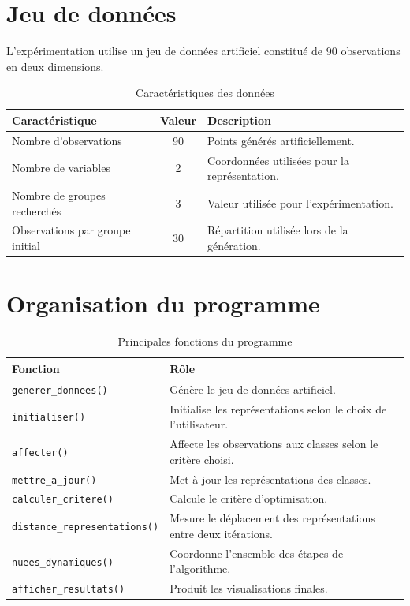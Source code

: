 \documentclass[12pt,a4paper]{report}
\begin{document}
\section{Jeu de données}

L'expérimentation utilise un jeu de données artificiel constitué de
90 observations en deux dimensions.

\begin{table}[H]
\centering
\caption{Caractéristiques des données}
\label{tab:donnees}
\begin{tabular}{|l|c|p{7cm}|}
\hline
\textbf{Caractéristique} & \textbf{Valeur} & \textbf{Description} \\
\hline
Nombre d'observations & 90 & Points générés artificiellement. \\
\hline
Nombre de variables & 2 & Coordonnées utilisées pour la représentation. \\
\hline
Nombre de groupes recherchés & 3 & Valeur utilisée pour l'expérimentation. \\
\hline
Observations par groupe initial & 30 & Répartition utilisée lors de la génération. \\
\hline
\end{tabular}
\end{table}

\section{Organisation du programme}

\begin{table}[H]
\centering
\caption{Principales fonctions du programme}
\label{tab:fonctions}
\begin{tabular}{|l|p{8.5cm}|}
\hline
\textbf{Fonction} & \textbf{Rôle} \\
\hline
\texttt{generer\_donnees()} &
Génère le jeu de données artificiel. \\
\hline
\texttt{initialiser()} &
Initialise les représentations selon le choix de l'utilisateur. \\
\hline
\texttt{affecter()} &
Affecte les observations aux classes selon le critère choisi. \\
\hline
\texttt{mettre\_a\_jour()} &
Met à jour les représentations des classes. \\
\hline
\texttt{calculer\_critere()} &
Calcule le critère d'optimisation. \\
\hline
\texttt{distance\_representations()} &
Mesure le déplacement des représentations entre deux itérations. \\
\hline
\texttt{nuees\_dynamiques()} &
Coordonne l'ensemble des étapes de l'algorithme. \\
\hline
\texttt{afficher\_resultats()} &
Produit les visualisations finales. \\
\hline
\end{tabular}
\end{table}
\end{document}
